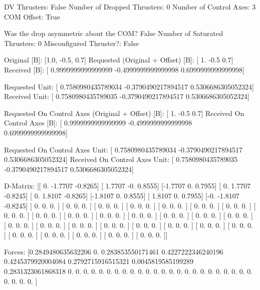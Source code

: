 DV Thrusters:	False
Number of Dropped Thrusters:	0
Number of Control Axes:	3
COM Offset:	True

Was the drop asymmetric about the COM?	False
Number of Saturated Thrusters:	0
Misconfigured Thruster?:	False

Original [B]:	[1.0, -0.5, 0.7]
Requested (Original + Offset) [B]:	[ 1.  -0.5  0.7]
Received [B]:		[ 0.9999999999999999 -0.4999999999999998  0.6999999999999998]

Requested Unit:		[ 0.7580980435789034 -0.3790490217894517  0.5306686305052324]
Received Unit:		[ 0.7580980435789035 -0.3790490217894517  0.5306686305052324]

Requested On Control Axes (Original + Offset) [B]:	[ 1.  -0.5  0.7]
Received On Control Axes [B]:		[ 0.9999999999999999 -0.4999999999999998  0.6999999999999998]

Requested On Control Axes Unit:		[ 0.7580980435789034 -0.3790490217894517  0.5306686305052324]
Received On Control Axes Unit:		[ 0.7580980435789035 -0.3790490217894517  0.5306686305052324]

D-Matrix:
[[ 0.     -1.7707 -0.8265]
 [ 1.7707 -0.      0.8555]
 [-1.7707  0.      0.7955]
 [ 0.      1.7707 -0.8245]
 [ 0.      1.8107 -0.8265]
 [-1.8107  0.      0.8555]
 [ 1.8107  0.      0.7955]
 [-0.     -1.8107 -0.8245]
 [ 0.      0.      0.    ]
 [ 0.      0.      0.    ]
 [ 0.      0.      0.    ]
 [ 0.      0.      0.    ]
 [ 0.      0.      0.    ]
 [ 0.      0.      0.    ]
 [ 0.      0.      0.    ]
 [ 0.      0.      0.    ]
 [ 0.      0.      0.    ]
 [ 0.      0.      0.    ]
 [ 0.      0.      0.    ]
 [ 0.      0.      0.    ]
 [ 0.      0.      0.    ]
 [ 0.      0.      0.    ]
 [ 0.      0.      0.    ]
 [ 0.      0.      0.    ]
 [ 0.      0.      0.    ]
 [ 0.      0.      0.    ]
 [ 0.      0.      0.    ]
 [ 0.      0.      0.    ]
 [ 0.      0.      0.    ]
 [ 0.      0.      0.    ]
 [ 0.      0.      0.    ]
 [ 0.      0.      0.    ]
 [ 0.      0.      0.    ]
 [ 0.      0.      0.    ]
 [ 0.      0.      0.    ]
 [ 0.      0.      0.    ]]

Forces:
[0.2849480635632206 0.                 0.283853550171461
 0.4227222346240196 0.4245379920004084 0.2792715916515321
 0.0045819585199289 0.2831323061868318 0.
 0.                 0.                 0.
 0.                 0.                 0.
 0.                 0.                 0.
 0.                 0.                 0.
 0.                 0.                 0.
 0.                 0.                 0.
 0.                 0.                 0.
 0.                 0.                 0.
 0.                 0.                 0.                ]

